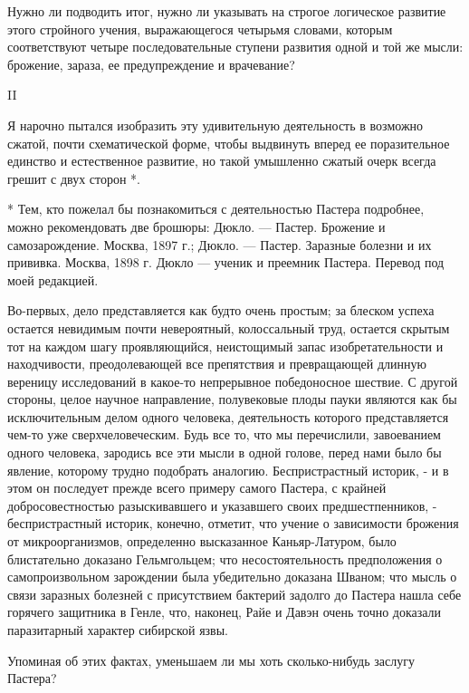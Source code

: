 Нужно  ли подводить  итог, нужно  ли указывать  на строгое  логическое
развитие  этого  стройного  учения,  выражающегося  четырьмя  словами,
которым соответствуют четыре последовательные ступени развития одной и
той же мысли: брожение, зараза, ее предупреждение и врачевание?

II

Я нарочно пытался изобразить  эту удивительную деятельность в возможно
сжатой,  почти   схематической  форме,   чтобы  выдвинуть   вперед  ее
поразительное  единство и  естественное развитие,  но такой  умышленно
сжатый очерк всегда грешит с двух сторон *.

* Тем, кто пожелал бы познакомиться с деятельностью Пастера подробнее,
можно  рекомендовать  две  брошюры:  Дюкло.  ---  Пастер.  Брожение  и
самозарождение. Москва, 1897 г.; Дюкло. --- Пастер. Заразные болезни и
их  прививка. Москва,  1898 г.  Дюкло ---  ученик и  преемник Пастера.
Перевод под моей редакцией.

Во-первых,  дело представляется  как будто  очень простым;  за блеском
успеха  остается  невидимым   почти  невероятный,  колоссальный  труд,
остается скрытым  тот на каждом шагу  проявляющийся, неистощимый запас
изобретательности  и находчивости,  преодолевающей  все препятствия  и
превращающей  длинную  вереницу  исследований в  какое-то  непрерывное
победоносное  шествие. С  другой стороны,  целое научное  направление,
полувековые  плоды   пауки  являются   как  бы   исключительным  делом
одного  человека,  деятельность  которого  представляется  чем-то  уже
сверхчеловеческим. Будь все то, что мы перечислили, завоеванием одного
человека, зародись  все эти мысли в  одной голове, перед нами  было бы
явление, которому трудно  подобрать аналогию. Беспристрастный историк,
- и в этом он последует прежде всего примеру самого Пастера, с крайней
добросовестностью разыскивавшего и  указавшего своих предшестпенников,
- беспристрастный историк, конечно,  отметит, что учение о зависимости
брожения от  микроорганизмов, определенно  высказанное Каньяр-Латуром,
было   блистательно  доказано   Гельмгольцем;  что   несостоятельность
предположения о самопроизвольном  зарождении была убедительно доказана
Шваном; что  мысль о связи  заразных болезней с  присутствием бактерий
задолго  до  Пастера  нашла  себе горячего  защитника  в  Генле,  что,
наконец,  Райе  и Давэн  очень  точно  доказали паразитарный  характер
сибирской язвы.

Упоминая об этих  фактах, уменьшаем ли мы  хоть сколько-нибудь заслугу
Пастера?


